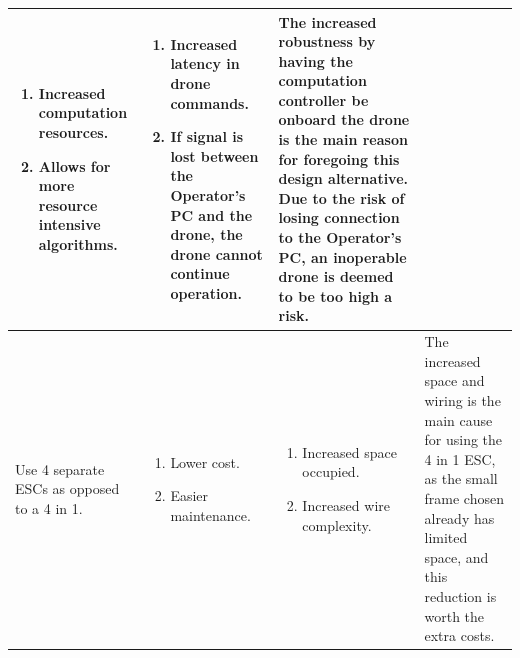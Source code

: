 \documentclass[12pt, titlepage]{article}
\begin{document}
\begin{landscape}
\begin{table}[!h]
\begin{center}
\begin{tabular}{ | m{4.5cm} | m{4.6cm} | m{6.5cm} | m{6.7cm} | }
    \begin{enumerate}
        \item Increased computation resources.
        \item Allows for more resource intensive algorithms.
    \end{enumerate} &
    \begin{enumerate}
        \item Increased latency in drone commands.
        \item If signal is lost between the Operator's PC and the drone, the drone cannot continue operation.
    \end{enumerate} &
    The increased robustness by having the computation controller be onboard the drone is the main reason for foregoing this design alternative. Due to the risk of losing connection to the Operator's PC, an inoperable drone is deemed to be too high a risk. \\
\hline
Use 4 separate ESCs as opposed to a 4 in 1. & 
    \begin{enumerate}
        \item Lower cost.
        \item Easier maintenance.
    \end{enumerate} &
    \begin{enumerate}
        \item Increased space occupied.
        \item Increased wire complexity.
    \end{enumerate} &
    The increased space and wiring is the main cause for using the 4 in 1 ESC, as the small frame chosen already has limited space, and this reduction is worth the extra costs. \\
\hline
\end{tabular}
\end{center}
\end{table}
\end{landscape}
\end{document}
